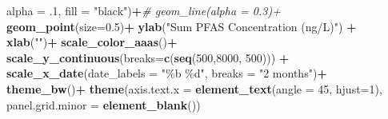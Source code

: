\documentclass[
]{article}
\newenvironment{Shaded}{\begin{snugshade}}{\end{snugshade}}
\newcommand{\AttributeTok}[1]{\textcolor[rgb]{0.13,0.29,0.53}{#1}}
\newcommand{\CommentTok}[1]{\textcolor[rgb]{0.56,0.35,0.01}{\textit{#1}}}
\newcommand{\DecValTok}[1]{\textcolor[rgb]{0.00,0.00,0.81}{#1}}
\newcommand{\FloatTok}[1]{\textcolor[rgb]{0.00,0.00,0.81}{#1}}
\newcommand{\FunctionTok}[1]{\textcolor[rgb]{0.13,0.29,0.53}{\textbf{#1}}}
\newcommand{\NormalTok}[1]{#1}
\newcommand{\SpecialCharTok}[1]{\textcolor[rgb]{0.81,0.36,0.00}{\textbf{#1}}}
\newcommand{\StringTok}[1]{\textcolor[rgb]{0.31,0.60,0.02}{#1}}
\begin{document}
\begin{Shaded}
\begin{Highlighting}[]
             \AttributeTok{alpha =}\NormalTok{ .}\DecValTok{1}\NormalTok{, }\AttributeTok{fill =} \StringTok{"black"}\NormalTok{)}\SpecialCharTok{+}\CommentTok{\# geom\_line(alpha = 0.3)+}
    \FunctionTok{geom\_point}\NormalTok{(}\AttributeTok{size=}\FloatTok{0.5}\NormalTok{)}\SpecialCharTok{+}
    \FunctionTok{ylab}\NormalTok{(}\StringTok{"Sum PFAS Concentration (ng/L)"}\NormalTok{) }\SpecialCharTok{+}
    \FunctionTok{xlab}\NormalTok{(}\StringTok{""}\NormalTok{)}\SpecialCharTok{+}
    \FunctionTok{scale\_color\_aaas}\NormalTok{()}\SpecialCharTok{+}
    \FunctionTok{scale\_y\_continuous}\NormalTok{(}\AttributeTok{breaks=}\FunctionTok{c}\NormalTok{(}\FunctionTok{seq}\NormalTok{(}\DecValTok{500}\NormalTok{,}\DecValTok{8000}\NormalTok{, }\DecValTok{500}\NormalTok{))) }\SpecialCharTok{+}
    \FunctionTok{scale\_x\_date}\NormalTok{(}\AttributeTok{date\_labels =} \StringTok{"\%b \%d"}\NormalTok{, }\AttributeTok{breaks =} \StringTok{"2 months"}\NormalTok{)}\SpecialCharTok{+}
    \FunctionTok{theme\_bw}\NormalTok{()}\SpecialCharTok{+}
    \FunctionTok{theme}\NormalTok{(}\AttributeTok{axis.text.x =} \FunctionTok{element\_text}\NormalTok{(}\AttributeTok{angle =} \DecValTok{45}\NormalTok{, }\AttributeTok{hjust=}\DecValTok{1}\NormalTok{),}
          \AttributeTok{panel.grid.minor =} \FunctionTok{element\_blank}\NormalTok{())}


\end{Highlighting}
\end{Shaded}
\end{document}
